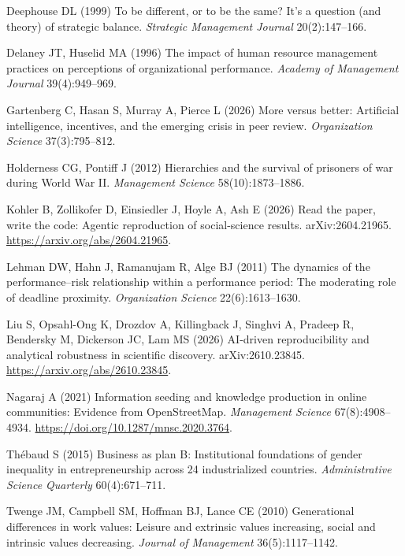 Deephouse DL (1999) To be different, or to be the same? It's a question (and theory) of strategic balance. \textit{Strategic Management Journal} 20(2):147--166.

Delaney JT, Huselid MA (1996) The impact of human resource management practices on perceptions of organizational performance. \textit{Academy of Management Journal} 39(4):949--969.

Gartenberg C, Hasan S, Murray A, Pierce L (2026) More versus better: Artificial intelligence, incentives, and the emerging crisis in peer review. \textit{Organization Science} 37(3):795--812.

Holderness CG, Pontiff J (2012) Hierarchies and the survival of prisoners of war during World War II. \textit{Management Science} 58(10):1873--1886.

Kohler B, Zollikofer D, Einsiedler J, Hoyle A, Ash E (2026) Read the paper, write the code: Agentic reproduction of social-science results. arXiv:2604.21965. \url{https://arxiv.org/abs/2604.21965}.

Lehman DW, Hahn J, Ramanujam R, Alge BJ (2011) The dynamics of the performance--risk relationship within a performance period: The moderating role of deadline proximity. \textit{Organization Science} 22(6):1613--1630.

Liu S, Opsahl-Ong K, Drozdov A, Killingback J, Singhvi A, Pradeep R, Bendersky M, Dickerson JC, Lam MS (2026) AI-driven reproducibility and analytical robustness in scientific discovery. arXiv:2610.23845. \url{https://arxiv.org/abs/2610.23845}.

Nagaraj A (2021) Information seeding and knowledge production in online communities: Evidence from OpenStreetMap. \textit{Management Science} 67(8):4908--4934. \url{https://doi.org/10.1287/mnsc.2020.3764}.

Th\'ebaud S (2015) Business as plan B: Institutional foundations of gender inequality in entrepreneurship across 24 industrialized countries. \textit{Administrative Science Quarterly} 60(4):671--711.

Twenge JM, Campbell SM, Hoffman BJ, Lance CE (2010) Generational differences in work values: Leisure and extrinsic values increasing, social and intrinsic values decreasing. \textit{Journal of Management} 36(5):1117--1142.

